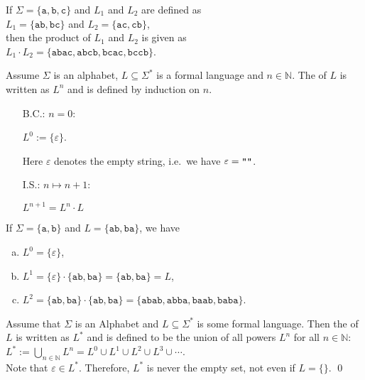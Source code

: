 \exampleEng
If $\Sigma = \{ \texttt{a}, \texttt{b}, \texttt{c} \}$ and $L_1$ and $L_2$ are defined as
\\[0.2cm]
\hspace*{1.3cm}
$L_1 = \{ \texttt{ab}, \texttt{bc} \}$ \quad and \quad
$L_2 = \{ \texttt{ac}, \texttt{cb} \}$,
\\[0.2cm]
then the product of $L_1$ and $L_2$ is given as
\\[0.2cm]
\hspace*{1.3cm}
$L_1 \cdot L_2 = \{ \texttt{abac}, \texttt{abcb}, \texttt{bcac}, \texttt{bccb} \}$.  \eox

\begin{Definition} 
Assume $\Sigma$ is an  alphabet, $L \subseteq \Sigma^*$ is a formal language and $n\in\mathbb{N}$.
The   of $L$  is written as  $L^n$  and is
defined by induction on  $n$.  
\begin{enumerate}
\item[B.C.:] $n = 0$: 

      $L^0 := \{ \varepsilon \}$.

      Here $\varepsilon$ denotes the empty string, i.e.~we have $\varepsilon = \texttt{\symbol{34}\symbol{34}}$.

\item[I.S.:] $n \mapsto n + 1$:

      $L^{n+1} = L^n \cdot L$  \eox
\end{enumerate}
\end{Definition}

\exampleEng
If $\Sigma = \{ \texttt{a}, \texttt{b} \}$ and $L = \{ \texttt{ab}, \texttt{ba} \}$, we have
\begin{enumerate}[(a)]
\item $L^0 = \{ \varepsilon \}$,
\item $L^1 = \{ \varepsilon \} \cdot \{ \texttt{ab}, \texttt{ba} \} = \{ \texttt{ab}, \texttt{ba} \} = L$,
\item $L^2 = \{ \texttt{ab}, \texttt{ba} \} \cdot \{ \texttt{ab}, \texttt{ba} \} = 
             \{ \texttt{abab}, \texttt{abba}, \texttt{baab}, \texttt{baba} \}$.  \eox
\end{enumerate}

\begin{Definition}
  Assume that $\Sigma$ is an Alphabet and $L \subseteq \Sigma^*$ is some formal language. Then the
    of $L$ is written as $L^*$  and is defined to be
  the union of all powers $L^n$ for all $n \in \mathbb{N}$: 
  \\[0.2cm]
  \hspace*{1.3cm}
  $L^* := \bigcup\limits_{n \in \mathbb{N}} L^n = L^0 \cup L^1 \cup L^2 \cup L^3 \cup \cdots$.
  \\[0.2cm]
  Note that $\varepsilon \in L^*$.  Therefore, $L^*$ is never the empty set, not even if $L = \{\}$.
  \qed  
\end{Definition}

